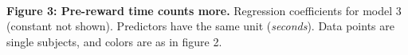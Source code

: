 \documentclass[11pt]{article}
\begin{document}
    \begin{center}
    \end{center}
    { \hspace*{\fill} \\}
    
    \textbf{Figure 3: Pre-reward time counts more.} Regression coefficients
for model 3 (constant not shown). Predictors have the same unit
(\emph{seconds}). Data points are single subjects, and colors are as in
figure 2.


    
    
    
    
\end{document}
